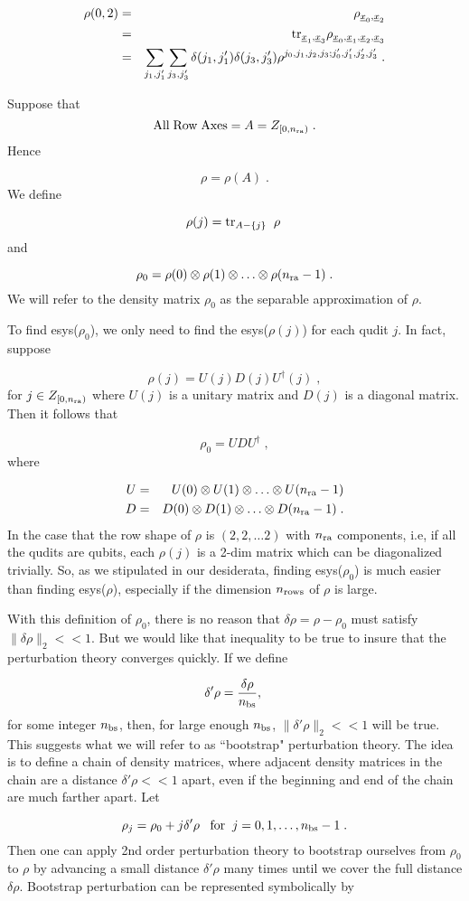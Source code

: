 \documentclass[12pt]{article}%
\newcommand{\tr}[0]{{\rm tr }}
\newcommand{\beq}{\begin{equation}}
\newcommand{\eeq}{\end{equation}}
\newcommand{\beqa}{\begin{eqnarray}}
\newcommand{\eeqa}{\end{eqnarray}}
\newcommand{\ul}[1]{\underline{#1}}
\newcommand{\rvx}[0]{{\ul{x}}}
\newcommand{\nra}[0]{{n_{\rm ra}}}
\newcommand{\nr}[0]{{n_{\rm rows}}}
\newcommand{\nbs}[0]{{n_{\rm bs}}}
\newcommand{\norm}[1]{\parallel #1 \parallel_2}
\begin{document}
\beqa
\rho(0,2) &=&\rho_{\rvx_0,\rvx_2}
\\&=&
\tr_{\rvx_1, \rvx_3}\rho_{\rvx_0, \rvx_1, \rvx_2, \rvx_3}
\\&=&\sum_{j_1, j'_1}\sum_{j_3, j'_3}
\delta(j_1, j'_1)
\delta(j_3, j_3') \rho^{j_0, j_1, j_2, j_3; j'_0, j'_1, j'_2, j'_3}
\;.
\eeqa

Suppose that
\beq
{\rm All\;Row\;Axes} = A = Z_{[0, \nra)}
\;.
\eeq
Hence

\beq
\rho= \rho(A)
\;.
\eeq
We define

\beq
\rho(j) = \tr_{A-\{j\}}
\;\;\rho
\;
\eeq
and

\beq
\rho_0 = \rho(0)\otimes \rho(1)
\otimes\ldots \otimes \rho(\nra-1)
\;.
\eeq
We will refer to the density matrix $\rho_0$ as
the separable approximation of $\rho$.

To find esys($\rho_0$),
we only need to find
the esys($\rho(j)$) for each qudit $j$.
In fact, suppose

\beq
\rho(j) = U(j)D(j)U^\dag(j)
\;,
\eeq
for $j\in Z_{[0, \nra)}$ where $U(j)$
is a unitary matrix and $D(j)$
is a diagonal matrix. Then it follows that

\beq
\rho_0 = UDU^\dag
\;,
\eeq
where

\beqa
U &=& U(0)\otimes U(1)\otimes\ldots\otimes U(\nra-1)
\\
D &=& D(0)\otimes D(1)\otimes\ldots\otimes D(\nra-1)
\;.
\eeqa
In the case that the
row shape
of $\rho$ is $(2,2, \ldots 2)$
with $\nra$ components, i.e, if all the qudits are qubits,
each $\rho(j)$
is a 2-dim matrix which can be diagonalized
trivially. So,
as we stipulated in our desiderata,
finding esys($\rho_0$)
is much easier than finding
esys($\rho$), especially if
the dimension $\nr$ of $\rho$ is large.


With this definition of $\rho_0$,
there is no reason that
$\delta \rho = \rho -\rho_0$
must satisfy
$\norm{\delta\rho}  << 1$.
But we would like that inequality to be true
to insure that the perturbation theory
converges quickly.
If we define

\beq
\delta'\rho = \frac{\delta\rho }{\nbs},
 \;
 \eeq
 for some integer $\nbs$, then,
 for large enough $\nbs$,
 $\norm{\delta'\rho} <<1$
 will be true. This suggests what we
 will refer to as
 ``bootstrap" perturbation theory.
 The idea is to define a chain of
 density matrices, where adjacent
density matrices in the chain are
 a distance
 $\delta'\rho<<1$ apart,
 even if the beginning and end
 of the chain are much farther apart.
 Let

 \beq
 \rho_j = \rho_0 + j \delta'\rho
 \;\;\;{\rm for} \;\;j=0, 1, \ldots, \nbs-1
 \;.
 \eeq
 Then one can apply 2nd order perturbation
 theory to
 bootstrap ourselves
from $\rho_0$ to $\rho$
by advancing a small distance
$\delta'\rho$ many times
until we cover the full distance
$\delta\rho$. Bootstrap perturbation
can be represented symbolically by
\end{document}
